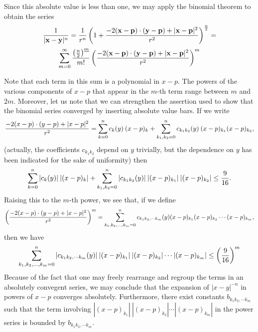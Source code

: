 \documentclass[12pt]{article}
\begin{document}
Since this absolute value is less than one, we may apply the binomial theorem to obtain the series
 $${1 \over |{\bf x} - {\bf y}|^n} = {1 \over r^n} \left( 1 + {- 2({\bf x} - {\bf p}) \cdot ({\bf y} - {\bf p}) + |{\bf x} - {\bf p}|^2 \over r^2} \right)^{n \over 2} = $$
$$\sum_{m = 0}^\infty {\left( {n \over 2} \right)^{\underline{m}} \over m!}  \left( {- 2({\bf x} - {\bf p}) \cdot ({\bf y} - {\bf p}) + |{\bf x} - {\bf p}|^2 \over r^2} \right)^m$$

Note that each term in this sum is a polynomial in $x-p$.  The powers of the various components of $x-p$ that appear in the $m$-th term range between $m$ and $2m$.  Moreover, let us note that we can strengthen the assertion used to show that the binomial series converged by inserting absolute value bars.  If we write
 $${- 2(x - p) \cdot (y - p) + |x - p|^2 \over r^2} = \sum_{k = 0}^n c_k (y) \> (x - p)_k + \sum_{k_1, k_2 = 0}^n c_{k_1 k_2} (y) \> (x - p)_{k_1} (x - p)_{k_2},$$
(actually, the coefficients $c_{k_1 k_2}$ depend on $y$ trivially, but the dependence on $y$ has been indicated for the sake of uniformity) then
 $$\sum_{k = 0}^n |c_k (y)| \> |(x - p)_k| + \sum_{k_1, k_2 = 0}^n |c_{k_1 k_2} (y)| \> |(x - p)_{k_1}| \> |(x - p)_{k_2}| \le {9 \over 16}.$$
Raising this to the $m$-th power, we see that, if we define
 $$\left( {- 2(x - p) \cdot (y - p) + |x - p|^2 \over r^2} \right)^m = \sum_{k_1, k_2, \ldots, k_m = 0}^n c_{k_1 k_2, \cdots k_m} (y) (x - p)_{k_1} (x - p)_{k_2} \cdots (x - p)_{k_m},$$
then we have
 $$\sum_{k_1, k_2, \ldots, k_m = 0}^n |c_{k_1 k_2, \cdots k_m} (y)| \> |(x - p)_{k_1}| \> |(x - p)_{k_2}| \cdots |(x - p)_{k_m}| \le \left( {9 \over 16} \right)^m$$
Because of the fact that one may freely rearrange and regroup the terms in an absolutely convegent series, we may conclude that the expansion of $|x - y|^{-n}$ in powers of $x - p$ converges absolutely.  Furthermore, there exist constants $b_{k_1 k_2, \cdots k_m}$ such that the term involving $|(x - p)_{k_1}| \> |(x - p)_{k_2}| \cdots |(x - p)_{k_m}|$ in the power series is bounded by $b_{k_1 k_2, \cdots k_m}$.
\end{document}
